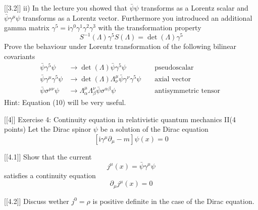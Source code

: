 [[3.2]]
ii) In the lecture you showed that $\bar{\psi} \psi$ transforms as a Lorentz scalar and $\bar{\psi} \gamma^\mu \psi$ transforms as a Lorentz vector. Furthermore you introduced an additional gamma matrix $\gamma^5=\mathrm{i} \gamma^0 \gamma^1 \gamma^2 \gamma^3$ with the transformation property
$$
S^{-1}(\Lambda) \gamma^5 S(\Lambda)=\operatorname{det}(\Lambda) \gamma^5
$$
Prove the behaviour under Lorentz transformation of the following bilinear covariants
$$
\begin{aligned}
\bar{\psi} \gamma^5 \psi & \rightarrow \operatorname{det}(\Lambda) \bar{\psi} \gamma^5 \psi & & \text { pseudoscalar } \\
\bar{\psi} \gamma^\mu \gamma^5 \psi & \rightarrow \operatorname{det}(\Lambda) \Lambda_\nu^\mu \bar{\psi} \gamma^\nu \gamma^5 \psi & & \text { axial vector } \\
\bar{\psi} \sigma^{\mu \nu} \psi & \rightarrow \Lambda_\alpha^\mu \Lambda_\beta^\nu \bar{\psi} \sigma^{\alpha \beta} \psi & & \text { antisymmetric tensor }
\end{aligned}
$$
Hint: Equation (10) will be very useful.


[[4]]
Exercise 4: Continuity equation in relativistic quantum mechanics II(4 points) Let the Dirac spinor $\psi$ be a solution of the Dirac equation
$$
\left[\mathrm{i} \gamma^\mu \partial_\mu-m\right] \psi(x)=0
$$

[[4.1]]
Show that the current
$$
j^\mu(x)=\bar{\psi} \gamma^\mu \psi
$$
satisfies a continuity equation
$$
\partial_\mu j^\mu(x)=0
$$

[[4.2]]
Discuss wether $j^0=\rho$ is positive definite in the case of the Dirac equation.